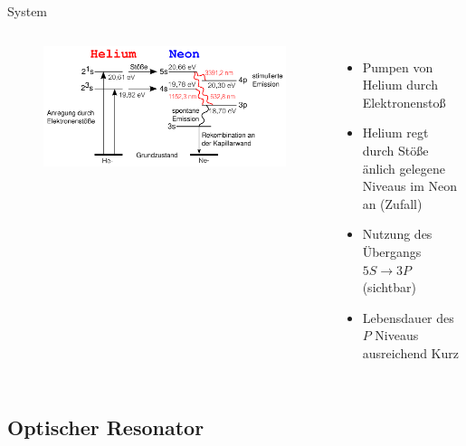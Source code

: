 \documentclass[10pt, aspectratio=169]{beamer}
\newcommand{\hne}{\ce{HeNe}}
\begin{document}
\begin{frame}{\hne{} System}
  \begin{columns}
    \begin{figure}[H]
      \includegraphics[width=1\columnwidth]{heneniv.png}
    \end{figure}
    \begin{itemize}
    \item<1-> Pumpen von Helium durch Elektronensto\ss{}
    \item<2-> Helium regt durch St\"o\ss{}e \"anlich gelegene Niveaus
      im Neon an (Zufall)
    \item<3-> Nutzung des \"Ubergangs \(5S\rightarrow 3P\) (sichtbar)
    \item<4-> Lebensdauer des \(P\) Niveaus ausreichend Kurz
    \end{itemize}
  \end{columns}
\end{frame}

\subsection{Optischer Resonator}
\label{sec:reso}
\end{document}
